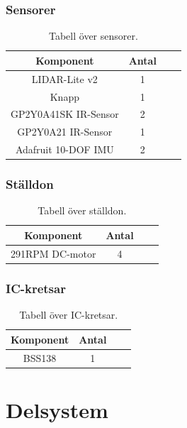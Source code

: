 \documentclass{article}
\begin{document}
\subsubsection{Sensorer}
\begin{table}[H]
  \centering
  \begin{tabular}{ | c | c | c | c |}
    \hline
    \textbf{Komponent} & \textbf{Antal} \\
    \hline
    LIDAR-Lite v2 & 1 \\
    \hline
    Knapp & 1 \\
    \hline
    GP2Y0A41SK IR-Sensor & 2 \\
    \hline
    GP2Y0A21 IR-Sensor & 1 \\
    \hline
    Adafruit 10-DOF IMU & 2 \\
    \hline
  \end{tabular}
  \caption{ Tabell över sensorer. }
\end{table}

\subsubsection{Ställdon}
\begin{table}[H]
  \centering
  \begin{tabular}{ | c | c | c | c |}
    \hline
    \textbf{Komponent} & \textbf{Antal} \\
    \hline
    291RPM DC-motor & 4 \\
    \hline
  \end{tabular}
  \caption{ Tabell över ställdon. }
\end{table}


\subsubsection{IC-kretsar}
\begin{table}[H]
  \centering
  \begin{tabular}{ | c | c | c | c |}
    \hline
    \textbf{Komponent} & \textbf{Antal} \\
    \hline
    BSS138 & 1 \\
    \hline
  \end{tabular}
  \caption{ Tabell över IC-kretsar. }
\end{table}

\clearpage
\section{Delsystem}
\end{document}
